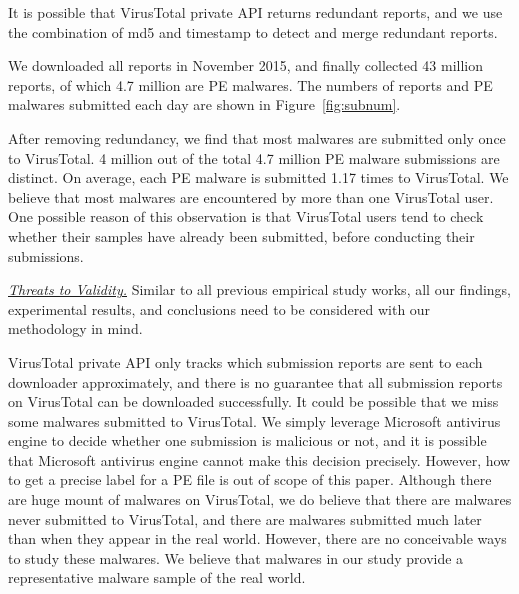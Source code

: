 It is possible that VirusTotal private API returns redundant reports, 
and we use the combination of md5 and timestamp
 to detect and merge redundant reports.

We downloaded all reports in November 2015, and finally collected 43 million reports, of which 4.7 million are PE malwares. 
The numbers of reports and PE malwares submitted each day are shown in Figure~\ref{fig:subnum}.

After removing redundancy, we find that most malwares are submitted only once to VirusTotal. 4 million out of the total 4.7 million PE malware submissions are distinct. On average, each PE malware is submitted 1.17 times to VirusTotal. We believe that most malwares are encountered by more than one VirusTotal user. One possible reason of this observation is that VirusTotal users 
tend to check whether their samples have already been submitted, 
before conducting their submissions.

\textit{\underline{Threats to Validity.}}
Similar to all previous empirical study works, all our findings, experimental results, 
and conclusions need to be considered with our methodology in mind. 

VirusTotal private API only tracks which submission reports are sent to each downloader approximately, 
and there is no guarantee that all submission reports on VirusTotal can be downloaded successfully. 
It could be possible that we miss some malwares submitted to VirusTotal. 
We simply leverage Microsoft antivirus engine to decide whether one submission is malicious or not, 
and it is possible that Microsoft antivirus engine cannot make this decision precisely. 
However, how to get a precise label for a PE file is out of scope of this paper.  
Although there are huge mount of malwares on VirusTotal, we do believe that there are malwares never submitted to VirusTotal, 
and there are malwares submitted much later than when they appear in the real world.
However, there are no conceivable ways to study these malwares. 
We believe that malwares in our study provide a representative malware sample of the real world. 



